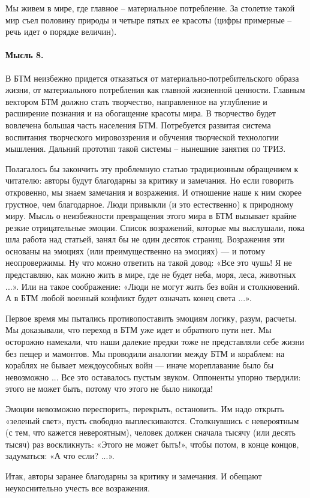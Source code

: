 \documentclass[11pt,a4paper]{article}
\begin{document}
Мы живем в мире, где главное -- материальное потребление. За столетие такой
мир съел половину природы и четыре пятых ее красоты (цифры примерные -- речь
идет о порядке величин).

\paragraph{Мысль 8.}
В БТМ неизбежно придется отказаться от материально-потребительского образа
жизни, от материального потребления как главной жизненной ценности. Главным
вектором БТМ должно стать творчество, направленное на углубление и расширение
познания и на обогащение красоты мира. В творчество будет вовлечена большая
часть населения БТМ. Потребуется развитая система воспитания творческого
мировоззрения и обучения творческой технологии мышления. Дальний прототип
такой системы -- нынешние занятия по ТРИЗ.

Полагалось бы закончить эту проблемную статью традиционным обращением к
читателю: авторы будут благодарны за критику и замечания. Но если говорить
откровенно, мы знаем замечания и возражения. И отношение наше к ним скорее
грустное, чем благодарное. Люди привыкли (и это естественно) к природному
миру.  Мысль о неизбежности превращения этого мира в БТМ вызывает крайне
резкие отрицательные эмоции. Список возражений, которые мы выслушали, пока шла
работа над статьей, занял бы не один десяток страниц. Возражения эти основаны
на эмоциях (или преимущественно на эмоциях) — и потому неопровержимы. Ну что
можно ответить на такой довод: «Все это чушь! Я не представляю, как можно жить
в мире, где не будет неба, моря, леса, животных ...». Или на такое
соображение: «Люди не могут жить без войн и столкновений. А в БТМ любой
военный конфликт будет означать конец света ...».

Первое время мы пытались противопоставить эмоциям логику, разум, расчеты. Мы
доказывали, что переход в БТМ уже идет и обратного пути нет. Мы осторожно
намекали, что наши далекие предки тоже не представляли себе жизни без пещер и
мамонтов. Мы проводили аналогии между БТМ и кораблем: на кораблях не бывает
междоусобных войн — иначе мореплавание было бы невозможно ... Все это
оставалось пустым звуком. Оппоненты упорно твердили: этого не может быть,
потому что этого не было никогда!

Эмоции невозможно переспорить, перекрыть, остановить. Им надо открыть «зеленый
свет», пусть свободно выплескиваются. Столкнувшись с невероятным (с тем, что
кажется невероятным), человек должен сначала тысячу (или десять тысяч) раз
воскликнуть: «Этого не может быть!», чтобы потом, в конце концов, задуматься:
«А что если? ...».

Итак, авторы заранее благодарны за критику и замечания. И обещают
неукоснительно учесть все возражения.
\end{document}
